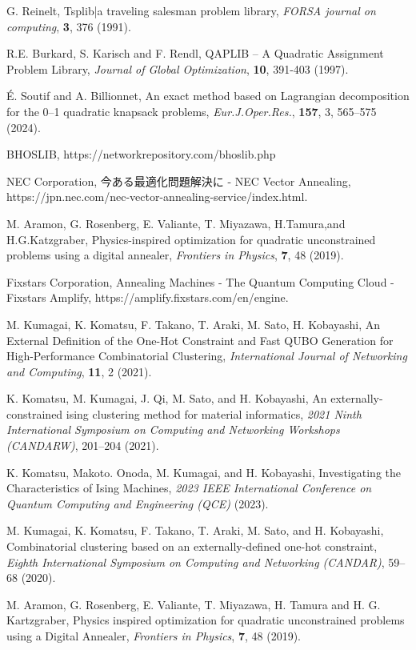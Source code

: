 \documentclass[submit,techrep,noauthor]{ipsj}
\begin{document}
\begin{thebibliography}{10}
G. Reinelt, Tsplib|a traveling salesman problem library, {\it FORSA journal on computing}, {\bf 3}, 376 (1991).

R.E. Burkard, S. Karisch and F. Rendl, QAPLIB – A Quadratic Assignment Problem Library, {\it Journal of Global Optimization}, {\bf 10}, 391-403 (1997).

É. Soutif and A. Billionnet, An exact method based on Lagrangian decomposition for the 0–1 quadratic knapsack problems, {\it Eur.J.Oper.Res.}, {\bf 157}, 3, 565–575 (2024).

BHOSLIB, https://networkrepository.com/bhoslib.php

NEC Corporation, 今ある最適化問題解決に - NEC Vector Annealing, https://jpn.nec.com/nec-vector-annealing-service/index.html.

M. Aramon, G. Rosenberg, E. Valiante, T. Miyazawa, H.Tamura,and H.G.Katzgraber, Physics-inspired optimization for quadratic unconstrained problems using a digital annealer, {\it Frontiers in Physics}, {\bf 7}, 48 (2019).

Fixstars Corporation, Annealing Machines - The Quantum Computing Cloud - Fixstars Amplify, https://amplify.fixstars.com/en/engine.

M. Kumagai, K. Komatsu, F. Takano, T. Araki, M. Sato, H. Kobayashi, An External Definition of the One-Hot Constraint and Fast QUBO Generation for High-Performance Combinatorial Clustering, {\it International Journal of Networking and Computing}, {\bf 11}, 2 (2021).

K. Komatsu, M. Kumagai, J. Qi, M. Sato, and H. Kobayashi, An externally-constrained ising clustering method for material informatics, {\it 2021 Ninth International Symposium on Computing and Networking Workshops (CANDARW)}, 201–204 (2021).

K. Komatsu, Makoto. Onoda, M. Kumagai, and H. Kobayashi, Investigating the Characteristics of Ising Machines, {\it 2023 IEEE International Conference on Quantum Computing and Engineering (QCE)} (2023).

M. Kumagai, K. Komatsu, F. Takano, T. Araki, M. Sato, and H. Kobayashi, Combinatorial clustering based on an externally-defined one-hot constraint, {\it Eighth International Symposium on Computing and Networking (CANDAR)}, 59–68 (2020).

M. Aramon, G. Rosenberg, E. Valiante, T. Miyazawa, H. Tamura and H. G. Kartzgraber, Physics inspired optimization for quadratic unconstrained problems using a Digital Annealer, {\it Frontiers in Physics}, {\bf 7}, 48 (2019).


\end{thebibliography}
\end{document}
